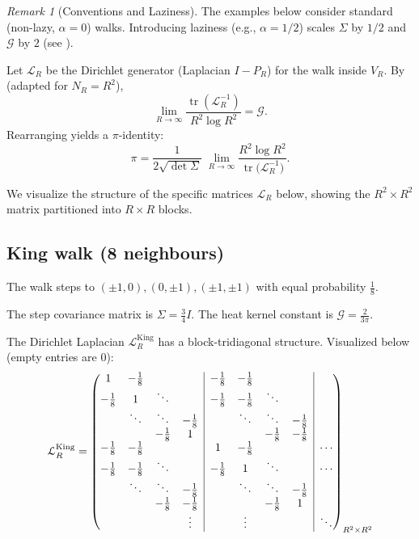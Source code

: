 \documentclass{article}
\numberwithin{equation}{section}
\theoremstyle{definition}
\theoremstyle{remark}
\newtheorem{remark}[theorem]{Remark}
\newcommand{\cG}{\mathcal{G}}
\DeclareMathOperator{\tr}{tr}
\begin{document}
\begin{remark}[Conventions and Laziness]\label{rem:laziness_appendix}
The examples below consider standard (non-lazy, $\alpha=0$) walks. Introducing laziness (e.g., $\alpha=1/2$) scales $\Sigma$ by $1/2$ and $\cG$ by $2$ (see ).
\end{remark}


Let $ \mathcal{L}_R $ be the Dirichlet generator (Laplacian $I-P_R$) for the walk inside $V_R$.
By  (adapted for $N_R=R^2$),
\[
\lim_{R\to\infty} \frac{\tr(\mathcal{L}_R^{-1})}{R^2 \log R^2} = \cG.
\]
Rearranging yields a $\pi$-identity:
\[\pi = \frac{1}{2\sqrt{\det\Sigma}}\;\lim_{R\to\infty}\frac{R^{2}\log R^{2}}{\tr\!\bigl(\mathcal{L}_R^{-1}\bigr)}.\]

We visualize the structure of the specific matrices $\mathcal{L}_R$ below, showing the $R^2 \times R^2$ matrix partitioned into $R \times R$ blocks.

\subsection{King walk (8 neighbours)}\label{app:king}

The walk steps to $(\pm1,0),(0,\pm1),(\pm1,\pm1)$ with equal probability $ \tfrac18 $.

The step covariance matrix is $\Sigma = \tfrac{3}{4} I$. The heat kernel constant is $\cG = \frac{2}{3\pi}$.

The Dirichlet Laplacian $\mathcal{L}_R^{\text{King}}$ has a block-tridiagonal structure. Visualized below (empty entries are 0):
\[
\mathcal{L}_R^{\text{King}} =
\left(\begin{array}{@{}cccc|cccc|c@{}}
1 & -\frac{1}{8} & & & -\frac{1}{8} & -\frac{1}{8} & & & \\
-\frac{1}{8} & 1 & \ddots & & -\frac{1}{8} & -\frac{1}{8} & \ddots & & \\
& \ddots & \ddots & -\frac{1}{8} & & \ddots & \ddots & -\frac{1}{8} & \\
& & -\frac{1}{8} & 1 & & & -\frac{1}{8} & -\frac{1}{8} & \\
\hline
-\frac{1}{8} & -\frac{1}{8} & & & 1 & -\frac{1}{8} & & & \cdots \\
-\frac{1}{8} & -\frac{1}{8} & \ddots & & -\frac{1}{8} & 1 & \ddots & & \cdots \\
& \ddots & \ddots & -\frac{1}{8} & & \ddots & \ddots & -\frac{1}{8} & \\
& & -\frac{1}{8} & -\frac{1}{8} & & & -\frac{1}{8} & 1 & \\
\hline
& & & \vdots & & \vdots & & & \ddots
\end{array}\right)_{R^2 \times R^2}
\]
\end{document}
